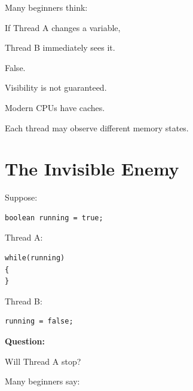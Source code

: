 \documentclass[11pt,a4paper]{book}
\begin{document}
\begin{trap}

Many beginners think:


If Thread A changes a variable,

Thread B immediately sees it.


False.


Visibility is not guaranteed.


Modern CPUs have caches.


Each thread may observe
different memory states.

\end{trap}


\section{The Invisible Enemy}

Suppose:

\begin{verbatim} 
boolean running = true;
\end{verbatim}

Thread A:

\begin{verbatim} 
while(running)
{
}
\end{verbatim}

Thread B:

\begin{verbatim} 
running = false;
\end{verbatim}


\textbf{Question:}

Will Thread A stop?


Many beginners say:

\end{document}
